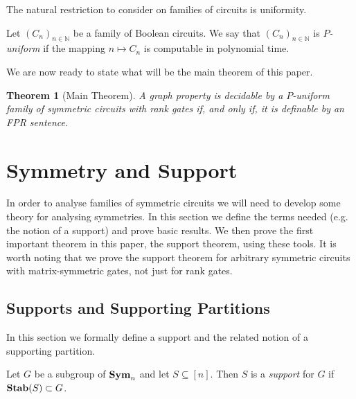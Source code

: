 \documentclass[12pt]{report}
\newtheorem{thm}{Theorem} \newtheorem{claim}[thm]{Claim}
\newcommand{\stab}{\text{\textbf{Stab}}}
\newcommand{\sym}{\text{\textbf{Sym}}}
\begin{document}
The natural restriction to consider on families of circuits is uniformity.

\begin{definition}
  Let $(C_n)_{n \in \mathbb{N}}$ be a family of Boolean circuits. We say that
  $(C_n)_{n \in \mathbb{N}}$ is \emph{$P$-uniform} if the mapping $n \mapsto C_n$ is
  computable in polynomial time.
\end{definition}

We are now ready to state what will be the main theorem of this paper.

\begin{thm}[Main Theorem]
 A graph property is decidable by a $P$-uniform family of symmetric circuits
 with rank gates if, and only if, it is definable by an FPR sentence.
\end{thm}



\chapter{Symmetry and Support}
In order to analyse families of symmetric circuits we will need to develop some
theory for analysing symmetries. In this section we define the terms needed
(e.g. the notion of a support) and prove basic results. We then prove the first
important theorem in this paper, the support theorem, using these tools. It is
worth noting that we prove the support theorem for arbitrary symmetric circuits
with matrix-symmetric gates, not just for rank gates.

\section{Supports and Supporting Partitions}
In this section we formally define a support and the related notion of a
supporting partition.

\begin{definition}
  Let $G$ be a subgroup of $\sym_n$ and let $S \subseteq [n]$. Then $S$ is a
  \emph{support} for $G$ if $\stab(S) \subset G$.
\end{definition}
\end{document}
